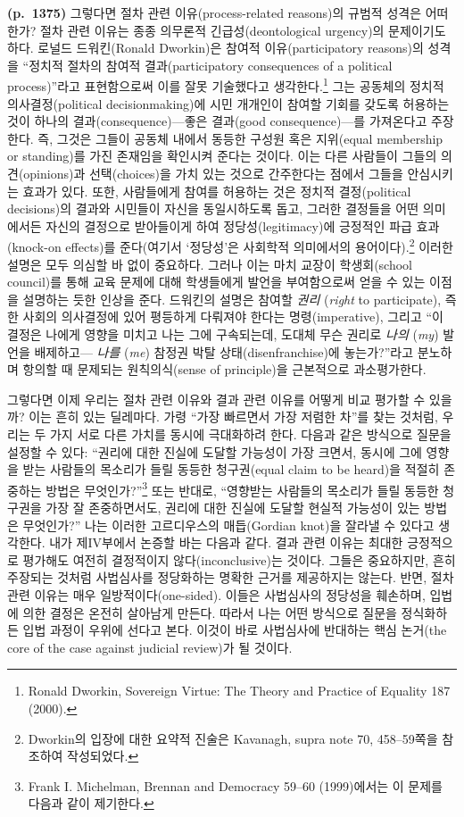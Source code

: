 \documentclass[a4paper,12pt,oneside]{article}  %
\newcommand{\emphksans}[1]{%
  {\kopubhangul\kopublatin\textsl{#1}}%
}
\begin{document}
\textbf{(p.~1375)} 그렇다면 절차 관련 이유(process-related reasons)의
규범적 성격은 어떠한가? 절차 관련 이유는 종종 의무론적
긴급성(deontological urgency)의 문제이기도 하다. 로널드 드워킨(Ronald
Dworkin)은 참여적 이유(participatory reasons)의 성격을 ``정치적 절차의
참여적 결과(participatory consequences of a political process)''라고
표현함으로써 이를 잘못 기술했다고 생각한다.\footnote{Ronald Dworkin,
  Sovereign Virtue: The Theory and Practice of Equality 187 (2000).}
그는 공동체의 정치적 의사결정(political decisionmaking)에 시민 개개인이
참여할 기회를 갖도록 허용하는 것이 하나의 결과(consequence)---좋은
결과(good consequence)---를 가져온다고 주장한다. 즉, 그것은 그들이
공동체 내에서 동등한 구성원 혹은 지위(equal membership or standing)를
가진 존재임을 확인시켜 준다는 것이다. 이는 다른 사람들이 그들의
의견(opinions)과 선택(choices)을 가치 있는 것으로 간주한다는 점에서
그들을 안심시키는 효과가 있다. 또한, 사람들에게 참여를 허용하는 것은
정치적 결정(political decisions)의 결과와 시민들이 자신을 동일시하도록
돕고, 그러한 결정들을 어떤 의미에서든 자신의 결정으로 받아들이게 하여
정당성(legitimacy)에 긍정적인 파급 효과(knock-on effects)를 준다(여기서
`정당성'은 사회학적 의미에서의 용어이다).\footnote{Dworkin의 입장에 대한
  요약적 진술은 Kavanagh, supra note 70, 458--59쪽을 참조하여
  작성되었다.} 이러한 설명은 모두 의심할 바 없이 중요하다. 그러나 이는
마치 교장이 학생회(school council)를 통해 교육 문제에 대해 학생들에게
발언을 부여함으로써 얻을 수 있는 이점을 설명하는 듯한 인상을 준다.
드워킨의 설명은 참여할 \emphksans{권리}(\emph{right} to participate), 즉 한
사회의 의사결정에 있어 평등하게 다뤄져야 한다는 명령(imperative), 그리고
``이 결정은 나에게 영향을 미치고 나는 그에 구속되는데, 도대체 무슨
권리로 \emphksans{나의}(\emph{my}) 발언을 배제하고---\emphksans{나를}(\emph{me}) 참정권 박탈
상태(disenfranchise)에 놓는가?''라고 분노하며 항의할 때 문제되는
원칙의식(sense of principle)을 근본적으로 과소평가한다.

그렇다면 이제 우리는 절차 관련 이유와 결과 관련 이유를 어떻게 비교
평가할 수 있을까? 이는 흔히 있는 딜레마다. 가령 ``가장 빠르면서 가장
저렴한 차''를 찾는 것처럼, 우리는 두 가지 서로 다른 가치를 동시에
극대화하려 한다. 다음과 같은 방식으로 질문을 설정할 수 있다: ``권리에
대한 진실에 도달할 가능성이 가장 크면서, 동시에 그에 영향을 받는
사람들의 목소리가 들릴 동등한 청구권(equal claim to be heard)을 적절히
존중하는 방법은 무엇인가?''\footnote{Frank I. Michelman, Brennan and
  Democracy 59--60 (1999)에서는 이 문제를 다음과 같이 제기한다.} 또는
반대로, ``영향받는 사람들의 목소리가 들릴 동등한 청구권을 가장 잘
존중하면서도, 권리에 대한 진실에 도달할 현실적 가능성이 있는 방법은
무엇인가?'' 나는 이러한 고르디우스의 매듭(Gordian knot)을 잘라낼 수
있다고 생각한다. 내가 제IV부에서 논증할 바는 다음과 같다. 결과 관련
이유는 최대한 긍정적으로 평가해도 여전히 결정적이지 않다(inconclusive)는
것이다. 그들은 중요하지만, 흔히 주장되는 것처럼 사법심사를 정당화하는
명확한 근거를 제공하지는 않는다. 반면, 절차 관련 이유는 매우
일방적이다(one-sided). 이들은 사법심사의 정당성을 훼손하며, 입법에 의한
결정은 온전히 살아남게 만든다. 따라서 나는 어떤 방식으로 질문을
정식화하든 입법 과정이 우위에 선다고 본다. 이것이 바로 사법심사에
반대하는 핵심 논거(the core of the case against judicial review)가 될
것이다.
\end{document}
